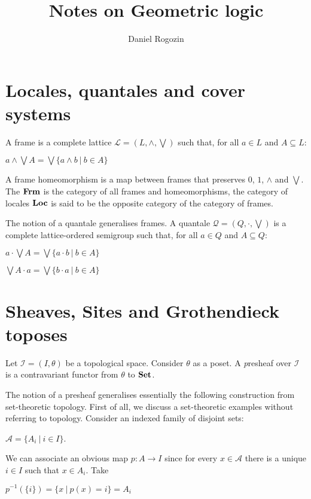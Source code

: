 \documentclass[a4paper]{article}
\author{Daniel Rogozin}
\date{}
\title{Notes on Geometric logic}
\theoremstyle{defin}
\theoremstyle{theorem}
\theoremstyle{claim}
\theoremstyle{prop}
\theoremstyle{lemma}
\theoremstyle{fact}
\theoremstyle{ex}
\theoremstyle{col}
\begin{document}
\maketitle

\section{Locales, quantales and cover systems}

A frame is a complete lattice $\mathcal{L} = (L, \wedge, \bigvee)$ such that, for all $a \in L$ and $A \subseteq L$:
\begin{center}
$a \wedge \bigvee A = \bigvee \{ a \wedge b \: | \: b \in A \}$
\end{center}
A frame homeomorphism is a map between frames that preserves $0$, $1$, $\wedge$ and $\bigvee$. The ${\bf Frm}$ is the category of all frames and homeomorphisms, the category of locales ${\bf Loc}$ is said to be the opposite category of the category of frames.

The notion of a quantale generalises frames. A quantale $\mathcal{Q} = (Q, \cdot, \bigvee)$ is a complete lattice-ordered semigroup such that, for all $a \in Q$ and $A \subseteq Q$:
\begin{center}
$a \cdot \bigvee A = \bigvee \{ a \cdot b \: | \: b \in A \}$

$\bigvee A \cdot a = \bigvee \{ b \cdot a \: | \: b \in A \}$
\end{center}

\section{Sheaves, Sites and Grothendieck toposes}

Let $\mathcal{I} = (I, \theta)$ be a topological space. Consider $\theta$ as a poset. A {\emph presheaf} over $\mathcal{I}$ is a contravariant functor from $\theta$ to ${\bf Set}$.

The notion of a presheaf generalises essentially the following construction from set-theoretic topology. First of all, we discuss a set-theoretic examples without referring to topology. Consider an indexed family of disjoint sets:
\begin{center}
$\mathcal{A} = \{ A_i \: | \: i \in I \}$.
\end{center}
We can associate an obvious map $p : A \to I$ since for every $x \in \mathcal{A}$ there is a unique $i \in I$ such that $x \in A_i$. Take

\begin{center}
$p^{-1}(\{ i \}) = \{ x \: | \: p(x) = i\} = A_i$
\end{center}
\end{document}
